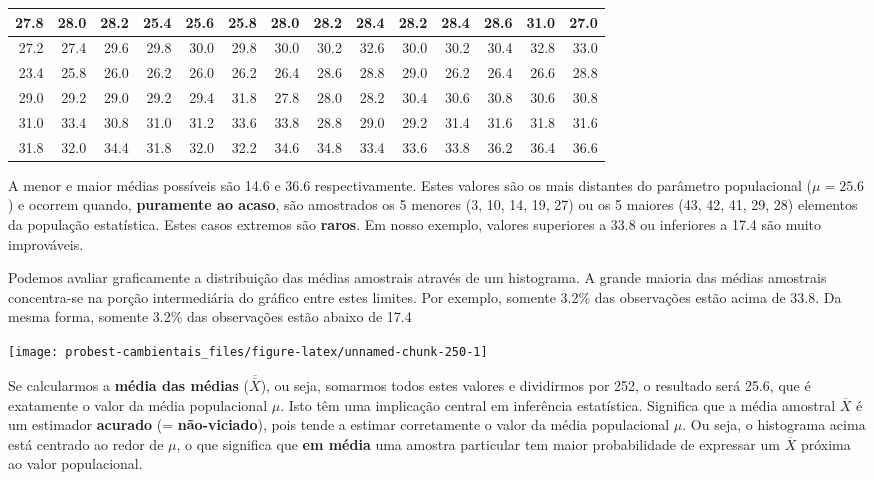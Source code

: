 \documentclass[
]{book}
\begin{document}
\begin{tabular}{r|r|r|r|r|r|r|r|r|r|r|r|r|r}
\hline
27.8 & 28.0 & 28.2 & 25.4 & 25.6 & 25.8 & 28.0 & 28.2 & 28.4 & 28.2 & 28.4 & 28.6 & 31.0 & 27.0\\
\hline
27.2 & 27.4 & 29.6 & 29.8 & 30.0 & 29.8 & 30.0 & 30.2 & 32.6 & 30.0 & 30.2 & 30.4 & 32.8 & 33.0\\
\hline
23.4 & 25.8 & 26.0 & 26.2 & 26.0 & 26.2 & 26.4 & 28.6 & 28.8 & 29.0 & 26.2 & 26.4 & 26.6 & 28.8\\
\hline
29.0 & 29.2 & 29.0 & 29.2 & 29.4 & 31.8 & 27.8 & 28.0 & 28.2 & 30.4 & 30.6 & 30.8 & 30.6 & 30.8\\
\hline
31.0 & 33.4 & 30.8 & 31.0 & 31.2 & 33.6 & 33.8 & 28.8 & 29.0 & 29.2 & 31.4 & 31.6 & 31.8 & 31.6\\
\hline
31.8 & 32.0 & 34.4 & 31.8 & 32.0 & 32.2 & 34.6 & 34.8 & 33.4 & 33.6 & 33.8 & 36.2 & 36.4 & 36.6\\
\hline
\end{tabular}

A menor e maior médias possíveis são 14.6 e 36.6 respectivamente. Estes valores são os mais distantes do parâmetro populacional (\(\mu = 25.6\)) e ocorrem quando, \textbf{puramente ao acaso}, são amostrados os 5 menores (3, 10, 14, 19, 27) ou os 5 maiores (43, 42, 41, 29, 28) elementos da população estatística. Estes casos extremos são \textbf{raros}. Em nosso exemplo, valores superiores a 33.8 ou inferiores a 17.4 são muito improváveis.

Podemos avaliar graficamente a distribuição das médias amostrais através de um histograma. A grande maioria das médias amostrais concentra-se na porção intermediária do gráfico entre estes limites. Por exemplo, somente 3.2\% das observações estão acima de 33.8. Da mesma forma, somente 3.2\% das observações estão abaixo de 17.4

\begin{center}\texttt{[image: probest-cambientais\_files/figure-latex/unnamed-chunk-250-1]} \end{center}

Se calcularmos a \textbf{média das médias} (\(\overline{\overline{X}}\)), ou seja, somarmos todos estes valores e dividirmos por 252, o resultado será 25.6, que é exatamente o valor da média populacional \(\mu\). Isto têm uma implicação central em inferência estatística. Significa que a média amostral \(\overline{X}\) é um estimador \textbf{acurado} (= \textbf{não-viciado}), pois tende a estimar corretamente o valor da média populacional \(\mu\). Ou seja, o histograma acima está centrado ao redor de \(\mu\), o que significa que \textbf{em média} uma amostra particular tem maior probabilidade de expressar um \(\overline{X}\) próxima ao valor populacional.
\end{document}

